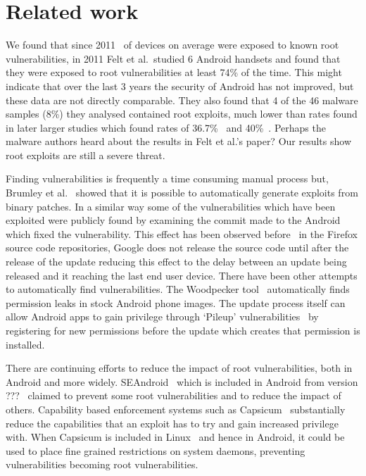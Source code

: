 \documentclass[conference,a4paper,twoside]{IEEEtran}
\begin{document}
\section{Related work}
\label{sec:related}
We found that since 2011 \daMeanInsecurityPerc\ of devices on average were exposed to known root vulnerabilities, in 2011 Felt et al.\ studied 6 Android handsets and found that they were exposed to root vulnerabilities at least 74\% of the time.
This might indicate that over the last 3 years the security of Android has not improved, but these data are not directly comparable.
They also found that 4 of the 46 malware samples (8\%) they analysed contained root exploits, much lower than rates found in later larger studies which found rates of 36.7\%~\cite{Zhou2012b} and 40\%~\cite{Zhou2012a}.
Perhaps the malware authors heard about the results in Felt et al.'s paper?
Our results show root exploits are still a severe threat.

Finding vulnerabilities is frequently a time consuming manual process but, Brumley et al.~\cite{Brumley2008} showed that it is possible to automatically generate exploits from binary patches.
In a similar way some of the vulnerabilities which have been exploited were publicly found by examining the commit made to the Android which fixed the vulnerability.
This effect has been observed before~\cite{Barth2011} in the Firefox source code repositories, Google does not release the source code until after the release of the update reducing this effect to the delay between an update being released and it reaching the last end user device.
There have been other attempts to automatically find vulnerabilities.
The Woodpecker tool~\cite{Grace2012} automatically finds permission leaks in stock Android phone images.
The update process itself can allow Android apps to gain privilege through `Pileup' vulnerabilities~\cite{Xing2014} by registering for new permissions before the update which creates that permission is installed.


There are continuing efforts to reduce the impact of root vulnerabilities, both in Android and more widely.
SEAndroid~\cite{Smalley2013} which is included in Android from version ???~\cite{TODO} claimed to prevent some root vulnerabilities and to reduce the impact of others.
Capability based enforcement systems such as Capsicum~\cite{Watson2010} substantially reduce the capabilities that an exploit has to try and gain increased privilege with.
When Capsicum is included in Linux~\cite{TODO} and hence in Android, it could be used to place fine grained restrictions on system daemons, preventing vulnerabilities becoming root vulnerabilities.
\end{document}
